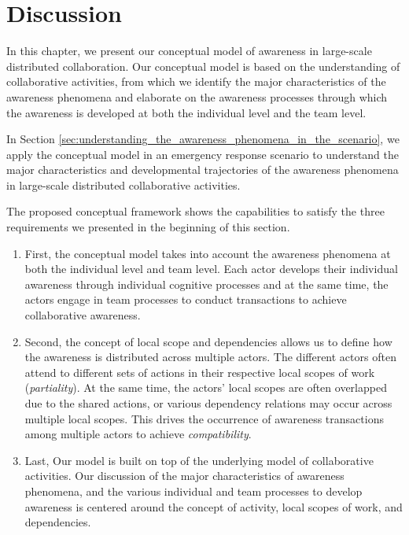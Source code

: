 \section{Discussion} %
\label{sec:discussion}
In this chapter, we present our conceptual model of awareness in large-scale distributed collaboration. Our conceptual model is based on the understanding of collaborative activities, from which we identify the major characteristics of the awareness phenomena and elaborate on the awareness processes through which the awareness is developed at both the individual level and the team level.

In Section \ref{sec:understanding_the_awareness_phenomena_in_the_scenario}, we apply the conceptual model in an emergency response scenario to understand the major characteristics and developmental trajectories of the awareness phenomena in large-scale distributed collaborative activities. 

The proposed conceptual framework shows the capabilities to satisfy the three requirements we presented in the beginning of this section.
\begin{enumerate}
	\item First, the conceptual model takes into account the awareness phenomena at both the individual level and team level. Each actor develops their individual awareness through individual cognitive processes and at the same time, the actors engage in team processes to conduct transactions to achieve collaborative awareness.  
	\item Second, the concept of local scope and dependencies allows us to define how the awareness is distributed across multiple actors. The different actors often attend to different sets of actions in their respective local scopes of work (\emph{partiality}). At the same time, the actors' local scopes are often overlapped due to the shared actions, or various dependency relations may occur across multiple local scopes. This drives the occurrence of awareness transactions among multiple actors to achieve \emph{compatibility}.
	\item Last, Our model is built on top of the underlying model of collaborative activities. Our discussion of the major characteristics of awareness phenomena, and the various individual and team processes to develop awareness is centered around the concept of activity, local scopes of work, and dependencies.
\end{enumerate}




 


